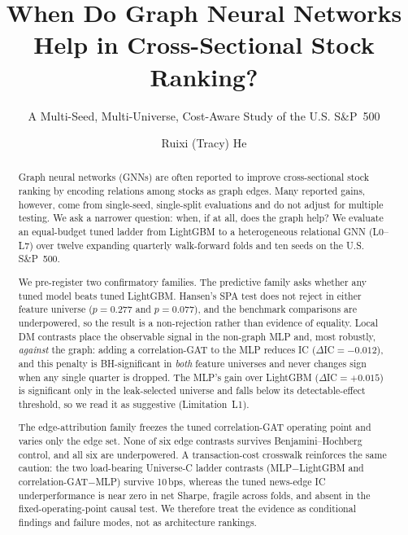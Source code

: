 \documentclass[sigconf,nonacm]{acmart}
\begin{document}
\title{When Do Graph Neural Networks Help in Cross-Sectional Stock Ranking?}
\subtitle{A Multi-Seed, Multi-Universe, Cost-Aware Study of the U.S. S\&P~500}

\author{Ruixi (Tracy) He}

\renewcommand{\shortauthors}{He}

\begin{abstract}
Graph neural networks (GNNs) are often reported to improve cross-sectional stock ranking by encoding relations among stocks as graph edges. Many reported gains, however, come from single-seed, single-split evaluations and do not adjust for multiple testing. We ask a narrower question: when, if at all, does the graph help? We evaluate an equal-budget tuned ladder from LightGBM to a heterogeneous relational GNN (L0--L7) over twelve expanding quarterly walk-forward folds and ten seeds on the U.S. S\&P~500.

We pre-register two confirmatory families. The predictive family asks whether any tuned model beats tuned LightGBM. Hansen's SPA test does not reject in either feature universe ($p=0.277$ and $p=0.077$), and the benchmark comparisons are underpowered, so the result is a non-rejection rather than evidence of equality. Local DM contrasts place the observable signal in the non-graph MLP and, most robustly, \emph{against} the graph: adding a correlation-GAT to the MLP reduces IC ($\Delta$IC${}=-0.012$), and this penalty is BH-significant in \emph{both} feature universes and never changes sign when any single quarter is dropped. The MLP's gain over LightGBM ($\Delta$IC${}=+0.015$) is significant only in the leak-selected universe and falls below its detectable-effect threshold, so we read it as suggestive (Limitation~L1).

The edge-attribution family freezes the tuned correlation-GAT operating point and varies only the edge set. None of six edge contrasts survives Benjamini--Hochberg control, and all six are underpowered. A transaction-cost crosswalk reinforces the same caution: the two load-bearing Universe-C ladder contrasts (MLP$-$LightGBM and correlation-GAT$-$MLP) survive 10\,bps, whereas the tuned news-edge IC underperformance is near zero in net Sharpe, fragile across folds, and absent in the fixed-operating-point causal test. We therefore treat the evidence as conditional findings and failure modes, not as architecture rankings.
\end{abstract}
\end{document}
